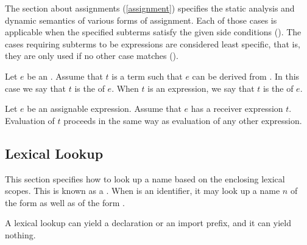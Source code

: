 \documentclass[makeidx]{article}
\begin{document}
\LMHash{}%
The section about assignments
(\ref{assignment})
specifies the static analysis and dynamic semantics of
various forms of assignment.
Each of those cases is applicable when the specified subterms satisfy
the given side conditions
().
The cases requiring subterms to be expressions are considered least specific,
that is, they are only used if no other case matches
().


\LMHash{}%
%
Let $e$ be an .
Assume that $t$ is a term such that $e$ can be derived from
.
In this case we say that $t$ is the
of $e$.
When $t$ is an expression, we say that $t$ is the
of $e$.


\LMHash{}%
Let $e$ be an assignable expression.
Assume that $e$ has a receiver expression $t$.
Evaluation of $t$ proceeds in the same way as
evaluation of any other expression.


\subsection{Lexical Lookup}

\LMHash{}%
This section specifies how to look up a name
based on the enclosing lexical scopes.
This is known as a .
When \id{} is an identifier,
it may look up a name $n$ of the form \id{} as well as of the form \code{\id=}.

\LMHash{}%
A lexical lookup can yield a declaration or an import prefix,
and it can yield nothing.
\end{document}
